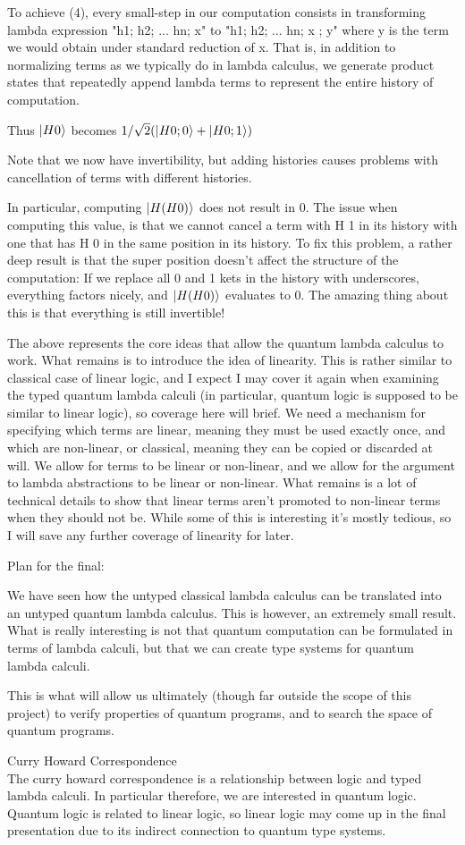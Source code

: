\documentclass{article}
\theoremstyle{plain}
\theoremstyle{definition}
\theoremstyle{remark}
\begin{document}
To achieve (4), every small-step in our computation consists in
transforming lambda expression "h1; h2; ... hn; x" to "h1; h2; ... hn; x ; y" where y is the term we would obtain under standard reduction of x.
That is, in addition to normalizing terms as we typically do in lambda calculus, we generate product states that repeatedly append lambda terms to represent the entire history of computation.

Thus $\left|\mspace{0.5mu} H 0 \mspace{0.5mu}\right\rangle$ becomes $1/\sqrt{2} (\left|\mspace{0.5mu} H 0; 0 \mspace{0.5mu}\right\rangle + \left|\mspace{0.5mu} H 0; 1 \mspace{0.5mu}\right\rangle)$


Note that we now have invertibility, but adding histories causes problems with cancellation of terms with different histories.

In particular, computing  $\left|\mspace{0.5mu} H (H 0) \mspace{0.5mu}\right\rangle$ does not result in 0. The issue when computing this value, is that we cannot cancel a term with H 1 in its history with one that has H 0 in the same position in its history. To fix this problem, a rather deep result is that the super position doesn't affect the structure of the computation: If we replace all 0 and 1 kets in the history with underscores, everything factors nicely, and $\left|\mspace{0.5mu} H (H 0) \mspace{0.5mu}\right\rangle$ evaluates to 0. The amazing thing about this is that everything is still invertible!
$$$$

The above represents the core ideas that allow the quantum lambda calculus to work.
What remains is to introduce the idea of linearity. This is rather similar to classical case of linear logic, and I expect I may cover it again when examining the typed quantum lambda calculi (in particular, quantum logic is supposed to be similar to linear logic), so coverage here will brief. We need a mechanism for specifying which terms are linear, meaning they must be used exactly once, and which are non-linear, or classical, meaning they can be copied or discarded at will. We allow for terms to be linear or non-linear, and we allow for the argument to lambda abstractions to be linear or non-linear. What remains is a lot of technical details to show that linear terms aren't promoted to non-linear terms when they should not be. While some of this is interesting it's mostly tedious, so I will save any further coverage of linearity for later.


Plan for the final:

We have seen how the untyped classical lambda calculus can be translated into an untyped quantum lambda calculus.
This is however, an extremely small result. What is really interesting is not that quantum computation can be formulated in terms of lambda calculi,
but that we can create type systems for quantum lambda calculi.

This is what will allow us ultimately (though far outside the scope of this project) to verify properties of quantum programs, and to search the space of quantum programs.

$$$$
Curry Howard Correspondence
$$$$
The curry howard correspondence is a relationship between logic and typed lambda calculi.
In particular therefore, we are interested in quantum logic.
Quantum logic is related to linear logic, so linear logic may come up in the final presentation due to its indirect connection to quantum type systems.
\end{document}
